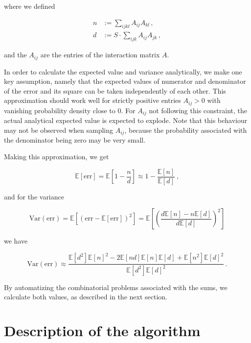 \documentclass[10pt]{article}
\begin{document}
where we defined

\begin{align}
    n &:= \sum_{ijkl} A_{ij}A_{kl} \,, \\
    d &:= S \cdot \sum_{ijk} A_{ij}A_{jk} \,, 
\end{align}

and the $A_{ij}$ are the entries of the interaction matrix $A$.

In order to calculate the expected value and variance analytically, 
we make one key assumption, namely that the expected values of numerator and denominator 
of the error and its square can be taken independently of each other. This approximation 
should work well for strictly positive entries $A_{ij} > 0$ with vanishing probability density 
close to 0. For $A_{ij}$ not following this constraint, the actual analytical expected value is
expected to explode. Note that this behaviour may not be observed when sampling $A_{ij}$, because 
the probability associated with the denominator being zero may be very small. 

Making this approximation, we get

\begin{equation}
     \mathbb{E}[\mathrm{err}] = \mathbb{E}\left[1 - \frac{n}{d}\right] \approx 1 - \frac{\mathbb{E}[n]}{\mathbb{E}[d]} \,,
\end{equation}

and for the variance

\begin{equation}
    \label{eq:Eerr}
 \mathrm{Var}(\mathrm{err}) = \mathbb{E}\left[\left(\mathrm{err} - \mathbb{E}[\mathrm{err}]\right)^2\right]
 = \mathbb{E}\left[\left(
 \frac{d \mathbb{E}[n] - n \mathbb{E}[d]}{d \mathbb{E}[d]}
 \right)^2\right]
\end{equation}

we have
 
\begin{equation}
    \label{eq:varerr}
    \mathrm{Var}(\mathrm{err}) \approx 
    \frac{\mathbb{E}[d^2]\mathbb{E}[n]^2 - 2 \mathbb{E}[nd]\mathbb{E}[n] \mathbb{E}[d] + \mathbb{E}[n^2]\mathbb{E}[d]^2}
    {\mathbb{E}[d^2]\mathbb{E}[d]^2} \,.
\end{equation}

By automatizing the combinatorial problems associated with the sums, we calculate both values, as described in the next section.

\section{Description of the algorithm}
\label{sec:description_of_the_algorithm}
\end{document}
